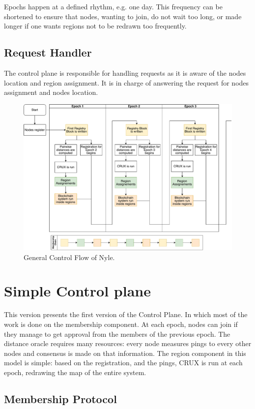 \documentclass[a4paper,11pt,twoside,openright]{report}
\begin{document}
Epochs happen at a defined rhythm, e.g. one day. This frequency can be
shortened to ensure that nodes, wanting to join, do not wait too long, or made
longer if one wants regions not to be redrawn too frequently. 

\subsection{Request Handler} The control plane is responsible for handling
requests as it is aware of the nodes location and region assignment. It is
in charge of answering the request for nodes assignment and nodes location. 

\begin{figure}[!h] 
\includegraphics[width=450pt]{figures/Nyle_controlflow}
\caption{General Control Flow of Nyle. }
\label{fig:controlflow}
\end{figure}

\section{Simple Control plane} This version presents the first version of the
Control Plane. In which most of the work is done on the membership component.
At each epoch, nodes can join if they manage to get approval from the members
of the previous epoch. The distance oracle requires many resources: every
node measures pings to every other nodes and consensus is made on that
information. The region component in this model is simple: based on the
registration, and the pings, CRUX is run at each epoch, redrawing the map of
the entire system. 

\subsection{Membership Protocol}
\end{document}

